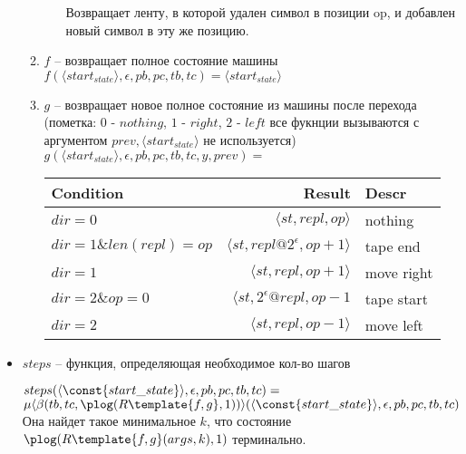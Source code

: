 \begin{itemize}
\begin{enumerate}
\begin{itemize}
Возвращает ленту, в которой удален символ в позиции op, и добавлен новый символ в эту же позицию.
\end{itemize}
\item $f$ -- возвращает полное состояние машины\\
$f(\langle start_{state} \rangle, \epsilon , pb, pc, tb, tc) = \langle start_{state} \rangle$
\item $g$ -- возвращает новое полное состояние из машины после перехода (пометка: $0$ - $nothing$, $1$ - $right$, $2$ - $left$ все фукнции вызываются с аргументом $prev, \langle start_{state} \rangle$ не используется)\\
$g(\langle start_{state} \rangle, \epsilon , pb, pc, tb, tc, y, prev) =$
\begin{center}
\begin{tabular}{lrl}
Condition & Result & Descr\\
\hline
$dir = 0$        & $\langle st, repl, op \rangle$ & nothing\\
$dir = 1 \& len(repl) = op$ & $\langle st, repl @ 2^{\epsilon}, op + 1 \rangle$ & tape end\\
$dir = 1$        & $\langle st, repl, op + 1 \rangle$ & move right\\
$dir = 2 \& op = 0$    & $\langle st, 2^{\epsilon} @ repl, op - 1$ & tape start\\
$dir = 2$      & $\langle st, repl, op - 1 \rangle$ & move left\\
\hline
\end{tabular}
\end{center}
\end{enumerate}
\item $steps$ -- функция, определяющая необходимое кол-во шагов

$steps(\langle \const{start\_state} \rangle, \epsilon , pb, pc, tb, tc) =$\\
$\mu \langle \beta(tb, tc, \plog(R\template{f, g}, 1))\rangle (\langle \const{start\_state} \rangle, \epsilon , pb, pc, tb, tc)$\\
Она найдет такое минимальное $k$, что состояние $\plog(R\template{f, g}(args, k), 1)$ терминально.
\end{itemize}
